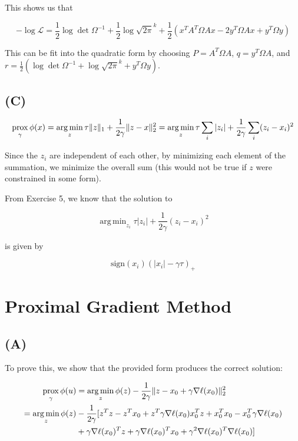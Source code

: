 \documentclass{article}
\DeclarePairedDelimiter\norm{\lVert}{\rVert}
\DeclareMathOperator*{\argmin}{arg\,min}
\newcommand{\prox}{ \mathop{\mathrm{prox}} }
\newcommand{\calL}{{\mathcal{L}}}
\begin{document}
This shows us that

\[
 - \log \calL =  \frac{1}{2} \log \det{\Omega^{-1}} + \frac{1}{2}\log
 \sqrt{2\pi}^k + \frac{1}{2} \left( x^TA^T\Omega A x - 2 y^T\Omega Ax + y^T \Omega y \right)

\]

This can be fit into the quadratic form by choosing $P = A^T\Omega A$, $q =
y^T\Omega A$, and $r = \frac{1}{2} \left( \log \det{\Omega^{-1}} + \log
  \sqrt{2\pi}^k + y^T \Omega y \right)$.

\subsection*{(C)}

\[
\prox_\gamma \phi(x) = \argmin_z \tau \norm{z}_1 + \frac{1}{2\gamma} \norm{z-
  x}_2^2 = \argmin_z \tau \sum_i |z_i| + \frac{1}{2\gamma} \sum_i (z_i - x_i)^2
\]

Since the $z_i$ are independent of each other, by minimizing each element of the
summation, we minimize the overall sum (this would not be true if $z$ were
constrained in some form).

From Exercise 5, we know that the solution to

\[
 \argmin_{z_i} \tau |z_i| + \frac{1}{2\gamma} (z_i - x_i)^2
\]

is given by

\[
  \mathrm{sign}(x_i)(|x_i| - \gamma\tau)_{+}
\]


\section*{Proximal Gradient Method}

\subsection*{(A)}

To prove this, we show that the provided form produces the correct solution:

\begin{alignat*}{2}
  \prox_\gamma \phi(u)
  &= \argmin_z \phi(z) - \frac{1}{2\gamma} \norm{z - x_0 + \gamma \nabla
    \ell(x_0)}_2^2\\
  = \argmin_z \phi(z) &- \frac{1}{2\gamma} [ z^Tz - z^Tx_0 +
    z^T \gamma\nabla\ell(x_0)
    x_0^Tz + x_0^Tx_0 - x_0^T\gamma \nabla\ell(x_0)\\
    &+  \gamma \nabla \ell(x_0)^Tz + \gamma\nabla\ell(x_0)^Tx_0 +
    \gamma^2 \nabla\ell(x_0)^T\nabla\ell(x_0) ]
\end{alignat*}
\end{document}
